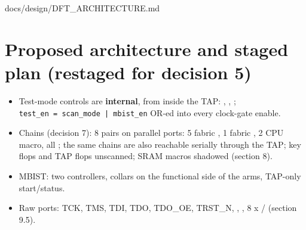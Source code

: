 \begin{relocated}{docs/design/DFT_ARCHITECTURE.md}
\section{Proposed architecture and staged plan (restaged for
decision 5)}\label{tm:ch:dft-architecture:10-proposed-architecture-and-staged-plan-restaged-for-decision-5}

\begin{itemize}
\tightlist
\item
  Test-mode controls are \textbf{internal}, from  inside
  the TAP: , , ;
  \texttt{test\_\allowbreak{}en\ =\allowbreak{}\ scan\_\allowbreak{}mode\ |\ mbist\_\allowbreak{}en}
  OR-ed into every clock-gate enable.
\item
  Chains (decision 7): 8 pairs on parallel ports: 5 fabric ,
  1 fabric , 2 CPU macro, all ; the same
  chains are also reachable serially through the TAP; key flops and TAP
  flops unscanned; SRAM macros shadowed (section 8).
\item
  MBIST: two controllers, collars on the functional side of the
   arms, TAP-only start/\allowbreak{}status.
\item
  Raw ports: TCK, TMS, TDI, TDO, TDO\_OE, TRST\_N, ,
  , 8 x / (section
  9.5).
\end{itemize}

{\footnotesize\setlength{\tabcolsep}{3pt}

}
\end{relocated}
